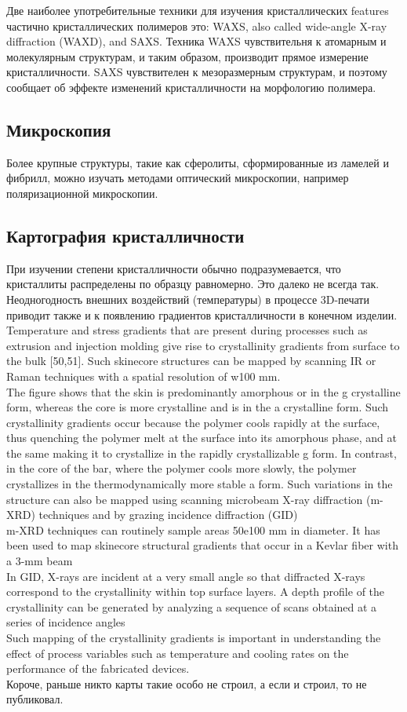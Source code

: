 Две наиболее употребительные техники для изучения кристаллических 
features частично кристаллических полимеров это: WAXS, also called wide-angle X-ray
diffraction (WAXD), and SAXS. 
Техника WAXS чувствительня к атомарным и молекулярным структурам, и таким образом, производит прямое измерение кристалличности. SAXS чувствителен к мезоразмерным структурам, и поэтому сообщает об эффекте изменений кристалличности на морфологию полимера.


\subsection{Микроскопия}
Более крупные структуры, такие как сферолиты, сформированные из ламелей и фибрилл, можно изучать методами оптический микроскопии, например поляризационной микроскопии.


\subsection{Картография кристалличности}
При изучении степени кристалличности обычно подразумевается, что кристаллиты распределены по образцу равномерно. Это далеко не всегда так. Неодногодность внешних воздействий (температуры) в процессе 3D-печати приводит также и к появлению градиентов кристалличности в конечном изделии. 
 Temperature
and stress gradients that are present during processes such as extrusion and injection
molding give rise to crystallinity gradients from surface to the bulk [50,51]. Such
skinecore structures can be mapped by scanning IR or Raman techniques with a
spatial resolution of w100 mm.\\
The figure shows that the skin is predominantly amorphous or in the g crystalline
form, whereas the core is more crystalline and is in the a crystalline form. Such crystallinity
gradients occur because the polymer cools rapidly at the surface, thus quenching
the polymer melt at the surface into its amorphous phase, and at the same making it
to crystallize in the rapidly crystallizable g form. In contrast, in the core of the bar,
where the polymer cools more slowly, the polymer crystallizes in the thermodynamically
more stable a form. Such variations in the structure can also be mapped using
scanning microbeam X-ray diffraction (m-XRD) techniques and by grazing incidence
diffraction (GID)\\
m-XRD techniques can routinely sample areas 50e100 mm
in diameter. It has been used to map skinecore structural gradients that occur in a
Kevlar fiber with a 3-mm beam
\\
In GID, X-rays are incident at a very small angle
so that diffracted X-rays correspond to the crystallinity within top surface layers. A
depth profile of the crystallinity can be generated by analyzing a sequence of scans
obtained at a series of incidence angles\\
Such mapping of the crystallinity gradients
is important in understanding the effect of process variables such as temperature
and cooling rates on the performance of the fabricated devices.\\
Короче, раньше никто карты такие особо не строил, а если и строил, то не публиковал.

